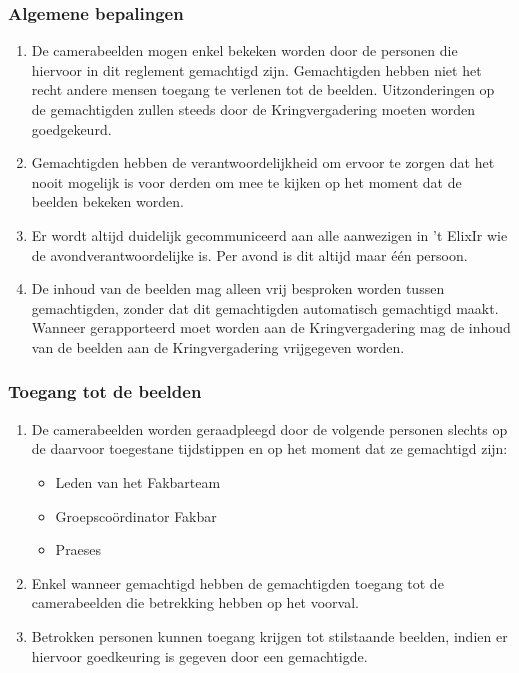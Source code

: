     \subsubsection{Algemene bepalingen}
    \begin{enumerate}
        \item De camerabeelden mogen enkel bekeken worden door de personen die hiervoor in dit reglement gemachtigd zijn. Gemachtigden hebben niet het recht andere mensen toegang te verlenen tot de beelden. Uitzonderingen op de gemachtigden zullen steeds door de Kringvergadering moeten worden goedgekeurd.
        \item Gemachtigden hebben de verantwoordelijkheid om ervoor te zorgen dat het nooit mogelijk is voor derden om mee te kijken op het moment dat de beelden bekeken worden. 
        \item Er wordt altijd duidelijk gecommuniceerd aan alle aanwezigen in 't ElixIr wie de avondverantwoordelijke is. Per avond is dit altijd maar \'e\'en persoon.
        \item De inhoud van de beelden mag alleen vrij besproken worden tussen gemachtigden, zonder dat dit gemachtigden automatisch gemachtigd maakt. Wanneer gerapporteerd moet worden aan de Kringvergadering mag de inhoud van de beelden aan de Kringvergadering vrijgegeven worden.
    \end{enumerate}

    \subsubsection{Toegang tot de beelden}
    \begin{enumerate}
        \item De camerabeelden worden geraadpleegd door de volgende personen slechts op de daarvoor toegestane tijdstippen en op het moment dat ze gemachtigd zijn:
        \begin{itemize}
            \item Leden van het Fakbarteam
            \item Groepsco\"ordinator Fakbar
            \item Praeses
        \end{itemize}
        \item Enkel wanneer gemachtigd hebben de gemachtigden toegang tot de camerabeelden die betrekking hebben op het voorval.
        \item Betrokken personen kunnen toegang krijgen tot stilstaande beelden, indien er hiervoor goedkeuring is gegeven door een gemachtigde.
    \end{enumerate}

